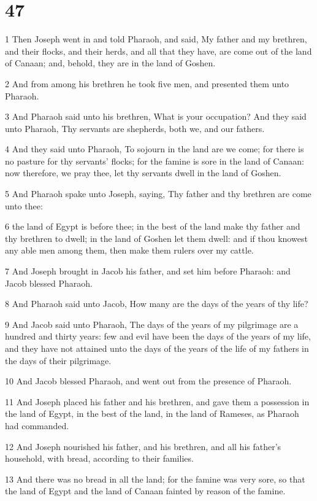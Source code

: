 \chapter{47}

\par 1 Then Joseph went in and told Pharaoh, and said, My father and my brethren, and their flocks, and their herds, and all that they have, are come out of the land of Canaan; and, behold, they are in the land of Goshen.
\par 2 And from among his brethren he took five men, and presented them unto Pharaoh.
\par 3 And Pharaoh said unto his brethren, What is your occupation? And they said unto Pharaoh, Thy servants are shepherds, both we, and our fathers.
\par 4 And they said unto Pharaoh, To sojourn in the land are we come; for there is no pasture for thy servants' flocks; for the famine is sore in the land of Canaan: now therefore, we pray thee, let thy servants dwell in the land of Goshen.
\par 5 And Pharaoh spake unto Joseph, saying, Thy father and thy brethren are come unto thee:
\par 6 the land of Egypt is before thee; in the best of the land make thy father and thy brethren to dwell; in the land of Goshen let them dwell: and if thou knowest any able men among them, then make them rulers over my cattle.
\par 7 And Joseph brought in Jacob his father, and set him before Pharaoh: and Jacob blessed Pharaoh.
\par 8 And Pharaoh said unto Jacob, How many are the days of the years of thy life?
\par 9 And Jacob said unto Pharaoh, The days of the years of my pilgrimage are a hundred and thirty years: few and evil have been the days of the years of my life, and they have not attained unto the days of the years of the life of my fathers in the days of their pilgrimage.
\par 10 And Jacob blessed Pharaoh, and went out from the presence of Pharaoh.
\par 11 And Joseph placed his father and his brethren, and gave them a possession in the land of Egypt, in the best of the land, in the land of Rameses, as Pharaoh had commanded.
\par 12 And Joseph nourished his father, and his brethren, and all his father's household, with bread, according to their families.
\par 13 And there was no bread in all the land; for the famine was very sore, so that the land of Egypt and the land of Canaan fainted by reason of the famine.
